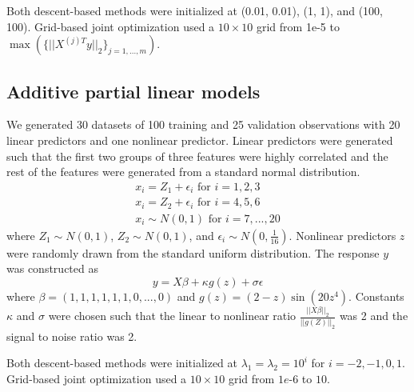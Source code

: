 \documentclass[10pt,letterpaper]{article}
\begin{document}
Both descent-based methods were initialized at (0.01, 0.01), (1, 1), and (100, 100). Grid-based joint optimization used a $10 \times 10$ grid from 1e-5 to $\max(\{||X^{(j)T}y ||_2\}_{j=1,..., m})$.

\subsection{Additive partial linear models}

We generated 30 datasets of 100 training and 25 validation observations with 20 linear predictors and one nonlinear predictor. Linear predictors were generated such that the first two groups of three features were highly correlated and the rest of the features were generated from a standard normal distribution.
\begin{equation}
\begin{array}{c}
x_i = Z_1 + \epsilon_i \text{ for } i=1, 2, 3 \\
x_i = Z_2 + \epsilon_i \text{ for } i= 4, 5, 6 \\
x_i \sim N(0,1) \text{ for } i = 7, ..., 20
\end{array}
\end{equation}
where $Z_1 \sim N(0,1)$, $Z_2 \sim N(0,1)$, and $\epsilon_i \sim N(0, \frac{1}{16})$. Nonlinear predictors $z$ were randomly drawn from the standard uniform distribution. The response $y$ was constructed as
\begin{equation}
y = X\beta + \kappa g(z) + \sigma \epsilon
\end{equation}
where $\beta = (1, 1, 1, 1, 1, 1, 0, ..., 0)$ and $g(z) =(2-z)\sin(20z^4)$. Constants $\kappa$ and $\sigma$ were chosen such that the linear to nonlinear ratio $\frac{||X\beta||_2}{||g(Z)||_2}$ was 2 and the signal to noise ratio was 2. 

Both descent-based methods were initialized at $\lambda_1 = \lambda_2 = 10^i$ for $i=-2, -1, 0, 1$. Grid-based joint optimization used a $10 \times 10$ grid from $1e\text{-}6$ to $10$.
\end{document}
